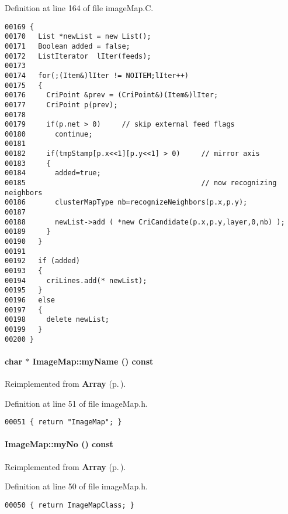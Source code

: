 Definition at line 164 of file image\-Map.C.\small\begin{verbatim}00169 {
00170   List *newList = new List();
00171   Boolean added = false;
00172   ListIterator  lIter(feeds);
00173 
00174   for(;(Item&)lIter != NOITEM;lIter++)
00175   {
00176     CriPoint &prev = (CriPoint&)(Item&)lIter;
00177     CriPoint p(prev);
00178 
00179     if(p.net > 0)     // skip external feed flags
00180       continue;
00181 
00182     if(tmpStamp[p.x<<1][p.y<<1] > 0)     // mirror axis 
00183     {
00184       added=true;
00185                                          // now recognizing neighbors
00186       clusterMapType nb=recognizeNeighbors(p.x,p.y);
00187 
00188       newList->add ( *new CriCandidate(p.x,p.y,layer,0,nb) );
00189     }
00190   }
00191 
00192   if (added)
00193   {
00194     criLines.add(* newList);
00195   }
00196   else
00197   {
00198     delete newList;
00199   }
00200 }
\end{verbatim}\normalsize 
\label{ImageMap_a3}
\paragraph{\setlength{\rightskip}{0pt plus 5cm}char $\ast$ Image\-Map::my\-Name () const\hspace{0.3cm}{\tt  [inline, virtual]}}\hfill



Reimplemented from {\bf Array} {\rm (p.\,\pageref{Array_a6})}.

Definition at line 51 of file image\-Map.h.\small\begin{verbatim}00051 { return "ImageMap"; }
\end{verbatim}\normalsize 
\label{ImageMap_a2}
\paragraph{ Image\-Map::my\-No () const\hspace{0.3cm}{\tt  [inline, virtual]}}\hfill



Reimplemented from {\bf Array} {\rm (p.\,\pageref{Array_a5})}.

Definition at line 50 of file image\-Map.h.\small\begin{verbatim}00050 { return ImageMapClass; }
\end{verbatim}\normalsize 
\label{ImageMap_a8}

